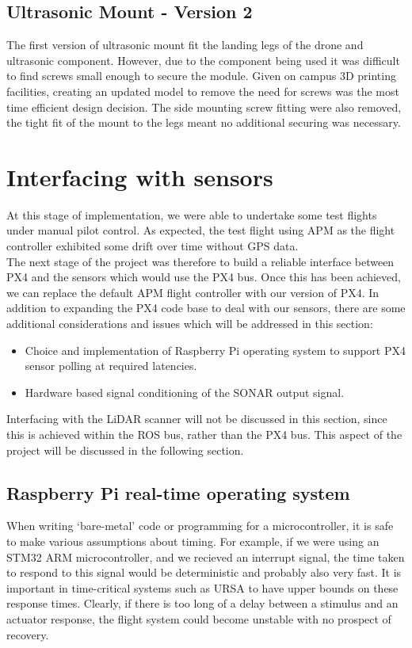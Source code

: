 \documentclass[capstone_report.tex]{subfiles}
\begin{document}
\subsection{Ultrasonic Mount - Version 2}

The first version of ultrasonic mount fit the landing legs of the drone and ultrasonic component.  However, due to the component being used it was difficult to find screws small enough to secure the module.  Given on campus 3D printing facilities, creating an updated model to remove the need for screws was the most time efficient design decision.  The side mounting screw fitting were also removed, the tight fit of the mount to the legs meant no additional securing was necessary.

\section{Interfacing with sensors}
    At this stage of implementation, we were able to undertake some test flights under manual pilot control. As expected, the test flight using APM as the flight controller exhibited some drift over time without GPS data. \\

    The next stage of the project was therefore to build a reliable interface between PX4 and the sensors which would use the PX4 bus. Once this has been achieved, we can replace the default APM flight controller with our version of PX4. In addition to expanding the PX4 code base to deal with our sensors, there are some additional considerations and issues which will be addressed in this section: 
    \begin{itemize}
        \item Choice and implementation of Raspberry Pi operating system to support PX4 sensor polling at required latencies.
        \item Hardware based signal conditioning of the SONAR output signal.
    \end{itemize}

    Interfacing with the LiDAR scanner will not be discussed in this section, since this is achieved within the ROS bus, rather than the PX4 bus. This aspect of the project will be discussed in the following section.\\

    \subsection{Raspberry Pi real-time operating system}
    When writing `bare-metal' code or programming for a microcontroller, it is safe to make various assumptions about timing. For example, if we were using an STM32 ARM microcontroller, and we recieved an interrupt signal, the time taken to respond to this signal would be deterministic and probably also very fast. It is important in time-critical systems such as URSA to have upper bounds on these response times. Clearly, if there is too long of a delay between a stimulus and an actuator response, the flight system could become unstable with no prospect of recovery. \\
\end{document}
